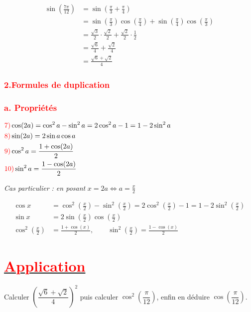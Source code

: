 \documentclass[a4paper,12pt]{article}
\begin{document}
\[
\begin{aligned}
\sin\left(\frac{7\pi}{12}\right) 
&= \sin\left(\frac{\pi}{3} + \frac{\pi}{4} \right) \\
&= \sin\left(\frac{\pi}{3}\right) \cos\left(\frac{\pi}{4}\right) + \sin\left(\frac{\pi}{4}\right) \cos\left(\frac{\pi}{3}\right) \\
&= \frac{\sqrt{3}}{2} \cdot \frac{\sqrt{2}}{2} + \frac{\sqrt{2}}{2} \cdot \frac{1}{2} \\
&= \frac{\sqrt{6}}{4} + \frac{\sqrt{2}}{4} \\
&= \boxed{\frac{\sqrt{6} + \sqrt{2}}{4}}
\end{aligned}
\]

\subsubsection*{\textcolor{red}{2.Formules de duplication }}
\subsubsection*{\textcolor{red}{a. Propriétés }}

\(
\begin{aligned}
&\textcolor{red}{\text{7)}}\cos(2a) = \cos^2 a - \sin^2 a = 2\cos^2 a - 1 = 1 - 2\sin^2 a \\
&\textcolor{red}{\text{8)}} \sin(2a) = 2 \sin a \cos a \\
&\textcolor{red}{\text{9)}}\cos^2 a = \frac{1 + \cos(2a)}{2} \\
&\textcolor{red}{\text{10)}}\sin^2 a = \frac{1 - \cos(2a)}{2}
\end{aligned}
\)

\vspace{0.5em}
\textit{Cas particulier : en posant } \( x = 2a \Leftrightarrow a = \frac{x}{2} \)

\[
\begin{aligned}
\cos x &= \cos^2\left(\frac{x}{2}\right) - \sin^2\left(\frac{x}{2}\right)
= 2 \cos^2\left(\frac{x}{2}\right) - 1 = 1 - 2 \sin^2\left(\frac{x}{2}\right) \\
\sin x &= 2 \sin\left(\frac{x}{2}\right) \cos\left(\frac{x}{2}\right) \\
\cos^2\left(\frac{x}{2}\right) &= \frac{1 + \cos(x)}{2}, \qquad 
\sin^2\left(\frac{x}{2}\right) = \frac{1 - \cos(x)}{2}
\end{aligned}
\]

\section*{\underline{\textcolor{red}{Application}}}
\noindent Calculer \( \left(\dfrac{\sqrt{6} + \sqrt{2}}{4}\right)^2 \) puis calculer \( \cos^2\left(\dfrac{\pi}{12}\right) \), enfin en déduire \( \cos\left(\dfrac{\pi}{12}\right) \).\\
\end{document}
